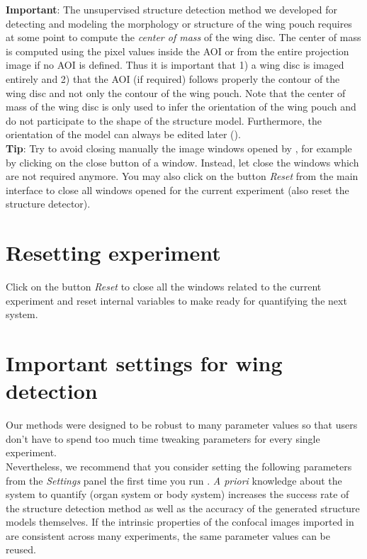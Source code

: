 \textbf{Important}: The unsupervised structure detection method we developed for detecting and modeling the morphology or structure of the \droso wing pouch requires at some point to compute the \emph{center of mass} of the wing disc. The center of mass is computed using the pixel values inside the AOI or from the entire projection image if no AOI is defined. Thus it is important that 1) a wing disc is imaged entirely and 2) that the AOI (if required) follows properly the contour of the wing disc and not only the contour of the wing pouch. Note that the center of mass of the wing disc is only used to infer the orientation of the wing pouch and do not participate to the shape of the structure model. Furthermore, the orientation of the model can always be edited later ().\\

\textbf{Tip}: Try to avoid closing manually the image windows opened by \wingj, for example by clicking on the close button of a window. Instead, let \wingj close the windows which are not required anymore. You may also click on the button \textit{Reset} from the main interface to close all windows opened for the current experiment (also reset the structure detector).

\section{Resetting experiment}
Click on the button \textit{Reset} to close all the windows related to the current experiment and reset internal variables to make \wingj ready for quantifying the next system.

\section{Important settings for \droso wing detection}
Our methods were designed to be robust to many parameter values so that users don't have to spend too much time tweaking parameters for every single experiment.\\

Nevertheless, we recommend that you consider setting the following parameters from the \textit{Settings} panel the first time you run \wingj. \textit{A priori} knowledge about the system to quantify (organ system or body system) increases the success rate of the structure detection method as well as the accuracy of the generated structure models themselves. If the intrinsic properties of the confocal images imported in \wingj are consistent across many experiments, the same parameter values can be reused.

